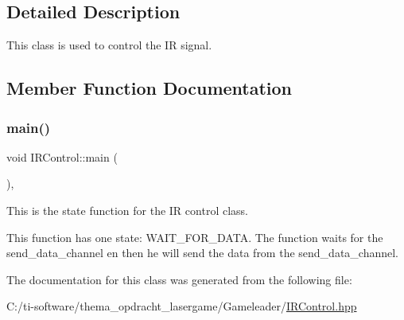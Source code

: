 \subsection{Detailed Description}
This class is used to control the IR signal. 

\subsection{Member Function Documentation}
\mbox{\label{class_i_r_control_a015c547c9a8a37bc99fc3f98190b6787}} 
\subsubsection{\texorpdfstring{main()}{main()}}
{\footnotesize\ttfamily void I\+R\+Control\+::main (\begin{DoxyParamCaption}{ }\end{DoxyParamCaption})\hspace{0.3cm}{\ttfamily [inline]}, {\ttfamily [override]}}



This is the state function for the IR control class. 

This function has one state\+: W\+A\+I\+T\+\_\+\+F\+O\+R\+\_\+\+D\+A\+TA. The function waits for the send\+\_\+data\+\_\+channel en then he will send the data from the send\+\_\+data\+\_\+channel. 

The documentation for this class was generated from the following file\+:\begin{DoxyCompactItemize}
\item 
C\+:/ti-\/software/thema\+\_\+opdracht\+\_\+lasergame/\+Gameleader/\mbox{\hyperlink{_i_r_control_8hpp}{I\+R\+Control.\+hpp}}\end{DoxyCompactItemize}

